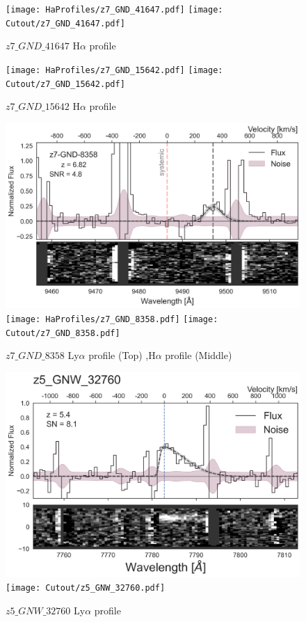 \documentclass[12pt,english]{article}
\begin{document}
\clearpage
\begin{figure}
\begin{center}\texttt{[image: HaProfiles/z7\_GND\_41647.pdf]}
\texttt{[image: Cutout/z7\_GND\_41647.pdf]}
\caption{$z7\_GND\_41647$ H$\alpha$ profile}
\end{center}
\end{figure}
\clearpage
\begin{figure}
\begin{center}\texttt{[image: HaProfiles/z7\_GND\_15642.pdf]}
\texttt{[image: Cutout/z7\_GND\_15642.pdf]}
\caption{$z7\_GND\_15642$ H$\alpha$ profile}
\end{center}
\end{figure}
\clearpage
\begin{figure}
\begin{center}\includegraphics[width=12cm, trim=0.1cm 0cm 0cm -1cm]{LyaProfiles/z7_GND_8358.png}
\texttt{[image: HaProfiles/z7\_GND\_8358.pdf]}
\texttt{[image: Cutout/z7\_GND\_8358.pdf]}
\caption{$z7\_GND\_8358$ Ly$\alpha$ profile (Top) ,H$\alpha$ profile (Middle)}
\end{center}
\end{figure}
\clearpage
\begin{figure}
\begin{center}\includegraphics[width=12cm, trim=0.1cm 0cm 0cm -1cm]{LyaProfiles/z5_GNW_32760.png}
\texttt{[image: Cutout/z5\_GNW\_32760.pdf]}
\caption{$z5\_GNW\_32760$ Ly$\alpha$ profile}
\end{center}
\end{figure}
\end{document}
